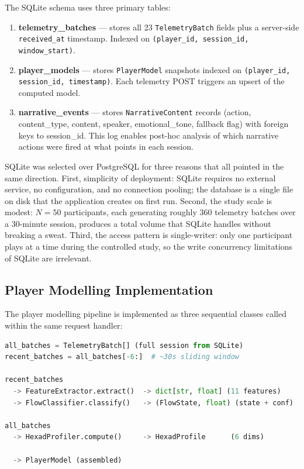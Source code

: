 The SQLite schema uses three primary tables:

\begin{enumerate}
\item \textbf{telemetry\_batches} --- stores all 23 \texttt{TelemetryBatch} fields plus a server-side \texttt{received\_at} timestamp. Indexed on \texttt{(player\_id, session\_id, window\_start)}.
\item \textbf{player\_models} --- stores \texttt{PlayerModel} snapshots indexed on \texttt{(player\_id, session\_id, timestamp)}. Each telemetry POST triggers an upsert of the computed model.
\item \textbf{narrative\_events} --- stores \texttt{NarrativeContent} records (action, content\_type, content, speaker, emotional\_tone, fallback flag) with foreign keys to session\_id. This log enables post-hoc analysis of which narrative actions were fired at what points in each session.
\end{enumerate}

SQLite was selected over PostgreSQL for three reasons that all pointed in the same direction. First, simplicity of deployment: SQLite requires no external service, no configuration, and no connection pooling; the database is a single file on disk that the application creates on first run. Second, the study scale is modest: $N = 50$ participants, each generating roughly 360 telemetry batches over a 30-minute session, produces a total volume that SQLite handles without breaking a sweat. Third, the access pattern is single-writer: only one participant plays at a time during the controlled study, so the write concurrency limitations of SQLite are irrelevant.

\subsection{Player Modelling Implementation}

The player modelling pipeline is implemented as three sequential classes called within the same request handler:

\begin{lstlisting}[language=Python, caption={Player modelling pipeline flow.}]
all_batches = TelemetryBatch[] (full session from SQLite)
recent_batches = all_batches[-6:]  # ~30s sliding window

recent_batches
  -> FeatureExtractor.extract()  -> dict[str, float] (11 features)
  -> FlowClassifier.classify()   -> (FlowState, float) (state + conf)

all_batches
  -> HexadProfiler.compute()     -> HexadProfile      (6 dims)

  -> PlayerModel (assembled)
\end{lstlisting}


